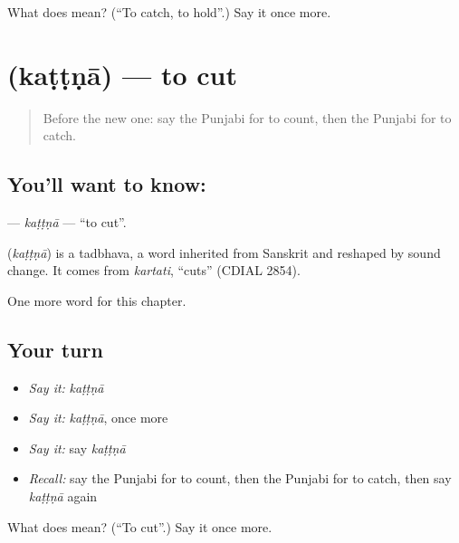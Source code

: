 \begin{tcolorbox}[breakable,colback=teal!4,colframe=teal!35!black,title={Before you move on}]
What does  mean? (\textquotedblleft{}To catch, to hold\textquotedblright{}.) Say it once more.
\end{tcolorbox}
\section[\texorpdfstring{\pa{ਕੱਟਣਾ} (kaṭṭṇā)}{ਕੱਟਣਾ (kaṭṭṇā)}]{ (kaṭṭṇā) — to cut}

\label{lesson:PA-C61-kattna}



\begin{quote}
Before the new one: say the Punjabi for to count, then the Punjabi for to catch.
\end{quote}

\subsection*{You'll want to know: }
\textbf{} — \emph{kaṭṭṇā} — \textquotedblleft{}to cut\textquotedblright{}.

\begin{cousinweb}
\textbf{} (\emph{kaṭṭṇā}) is a tadbhava, a word inherited from Sanskrit and reshaped by sound change. It comes from \emph{kartati}, \textquotedblleft{}cuts\textquotedblright{} (CDIAL 2854).
\end{cousinweb}

\begin{grammarlens}[title={What you've built}]
One more word for this chapter.
\end{grammarlens}

\subsection*{Your turn}
\begin{itemize}
\raggedright
  \item \emph{Say it:} \emph{kaṭṭṇā}
  \item \emph{Say it:} \emph{kaṭṭṇā}, once more
  \item \emph{Say it:} say \emph{kaṭṭṇā}
  \item \emph{Recall:} say the Punjabi for to count, then the Punjabi for to catch, then say \emph{kaṭṭṇā} again
\end{itemize}

\begin{tcolorbox}[breakable,colback=teal!4,colframe=teal!35!black,title={Before you move on}]
What does  mean? (\textquotedblleft{}To cut\textquotedblright{}.) Say it once more.
\end{tcolorbox}
